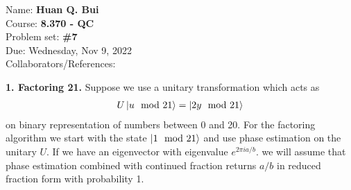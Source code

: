 \documentclass{article}
\theoremstyle{definition}
\begin{document}
\begin{framed}
\noindent Name: \textbf{Huan Q. Bui}\\
Course: \textbf{8.370 - QC}\\
Problem set: \textbf{\#7}\\
Due: Wednesday, Nov 9, 2022\\
Collaborators/References: 
\end{framed}


\noindent \textbf{1. Factoring 21.} Suppose we use a unitary transformation which acts as
\begin{align*}
U \ket{u \mod 21} = \ket{2y \mod 21}
\end{align*}
on binary representation of numbers between 0 and 20. For the factoring algorithm we start with the state $\ket{1 \mod 21}$ and use phase estimation on the unitary $U$. If we have an eigenvector with eigenvalue $e^{2\pi i a/b}$. we will assume that phase estimation combined with continued fraction returns $a/b$ in reduced fraction form with probability 1.  
\end{document}
